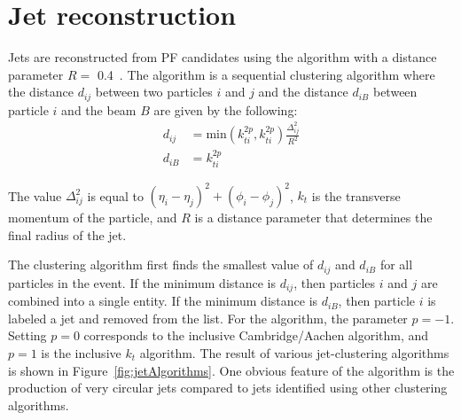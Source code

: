 


\section{Jet reconstruction}
\label{sec:Jet}
Jets are reconstructed from PF candidates using the \antikt algorithm with a distance parameter $R =$ 0.4~\cite{antikt}.  The \antikt algorithm is a sequential clustering algorithm where the distance $d_{ij}$ between two particles $i$ and $j$ and the distance $d_{iB}$ between particle $i$ and the beam $B$ are given by the following: 
\begin{equation}
\begin{aligned}
d_{ij} &= \mathrm{min}(k_{ti}^{2p},k_{ti}^{2p})\frac{\Delta^2_{ij}}{R^2} \\
d_{iB} &= k_{ti}^{2p}
\end{aligned}
\end{equation}

The value $\Delta^2_{ij}$ is equal to $(\eta_i - \eta_j)^2 + (\phi_i - \phi_j)^2$, $k_t$ is the transverse momentum of the particle, and $R$ is a distance parameter that determines the final radius of the jet.

The clustering algorithm first finds the smallest value of $d_{ij}$ and $d_{iB}$ for all particles in the event. If the minimum distance is $d_{ij}$, then particles $i$ and $j$ are combined into a single entity. If the minimum distance is $d_{iB}$, then particle $i$ is labeled a jet and removed from the list. For the \antikt algorithm, the parameter $p = -1$. Setting $p=0$ corresponds to the inclusive Cambridge/Aachen algorithm, and $p=1$ is the inclusive $k_t$ algorithm. The result of various jet-clustering algorithms is shown in Figure~\ref{fig:jetAlgorithms}. One obvious feature of the \antikt algorithm is the production of very circular jets compared to jets identified using other clustering algorithms.
 
